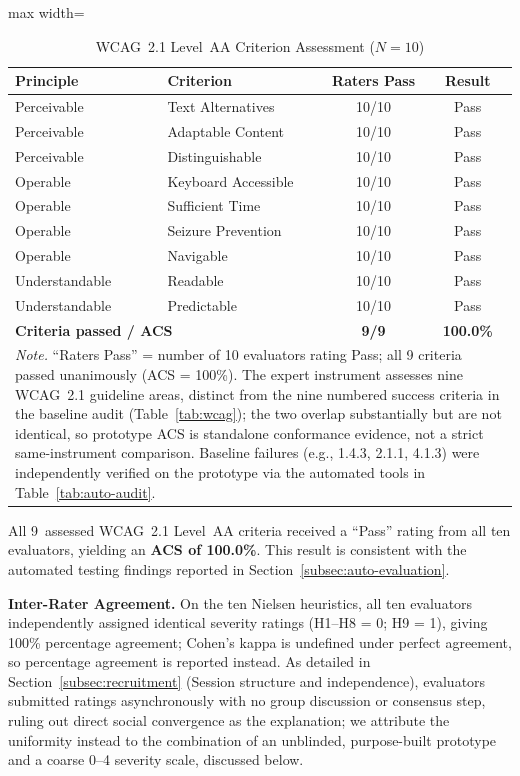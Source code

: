 \documentclass[journal,onecolumn]{IEEEtran}
\begin{document}
\begin{table}[htbp]
\centering
\caption{WCAG~2.1 Level~AA Criterion Assessment ($N=10$)}
\label{tab:wcag-heuristic}
\small
\begin{adjustbox}{max width=\columnwidth}
\begin{tabular}{|p{1.9cm}|p{2.8cm}|c|c|}
\hline
\textbf{Principle} & \textbf{Criterion} & \textbf{Raters Pass} & \textbf{Result} \\
\hline
Perceivable & Text Alternatives & 10/10 & Pass \\
\hline
Perceivable & Adaptable Content & 10/10 & Pass \\
\hline
Perceivable & Distinguishable & 10/10 & Pass \\
\hline
Operable & Keyboard Accessible & 10/10 & Pass \\
\hline
Operable & Sufficient Time & 10/10 & Pass \\
\hline
Operable & Seizure Prevention & 10/10 & Pass \\
\hline
Operable & Navigable & 10/10 & Pass \\
\hline
Understandable & Readable & 10/10 & Pass \\
\hline
Understandable & Predictable & 10/10 & Pass \\
\hline
\multicolumn{2}{|l|}{\textbf{Criteria passed / ACS}} & \textbf{9/9} & \textbf{100.0\%} \\
\hline
\multicolumn{4}{l}{\footnotesize\textit{Note.} ``Raters Pass'' = number of 10 evaluators rating Pass; all 9 criteria passed unanimously (ACS = 100\%). The expert instrument assesses nine WCAG~2.1 guideline areas, distinct from the nine numbered success criteria in the baseline audit (Table~\ref{tab:wcag}); the two overlap substantially but are not identical, so prototype ACS is standalone conformance evidence, not a strict same-instrument comparison. Baseline failures (e.g., 1.4.3, 2.1.1, 4.1.3) were independently verified on the prototype via the automated tools in Table~\ref{tab:auto-audit}.}
\end{tabular}
\end{adjustbox}
\end{table}

All 9~assessed WCAG~2.1 Level~AA criteria received a ``Pass'' rating
from all ten evaluators, yielding an \textbf{ACS of 100.0\%}. This result
is consistent with the automated testing findings reported in
Section~\ref{subsec:auto-evaluation}.

\textbf{Inter-Rater Agreement.} On the ten Nielsen heuristics, all ten evaluators independently assigned identical severity ratings (H1--H8 = 0; H9 = 1), giving 100\% percentage agreement; Cohen's kappa is undefined under perfect agreement, so percentage agreement is reported instead. As detailed in Section~\ref{subsec:recruitment} (Session structure and independence), evaluators submitted ratings asynchronously with no group discussion or consensus step, ruling out direct social convergence as the explanation; we attribute the uniformity instead to the combination of an unblinded, purpose-built prototype and a coarse 0--4 severity scale, discussed below.
\end{document}
